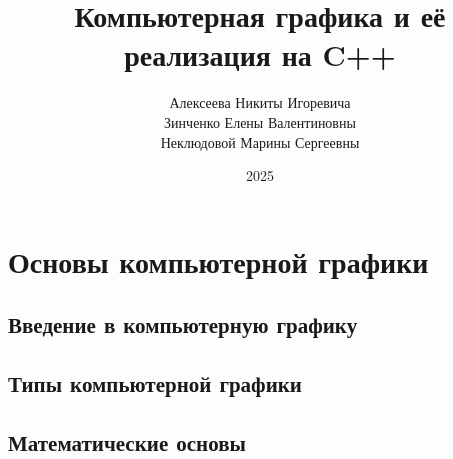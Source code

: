 \documentclass[referat]{SCWorks}
\begin{document}

\title{Компьютерная графика и её реализация на C++}






\author{Алексеева Никиты Игоревича \\ Зинченко Елены Валентиновны \\ Неклюдовой Марины Сергеевны}


\date{2025}

\maketitle

\secNumbering

\tableofcontents

\intro


\section{Основы компьютерной графики}
\subsection{Введение в компьютерную графику}

\subsection{Типы компьютерной графики}

\subsection{Математические основы}

\end{document}
